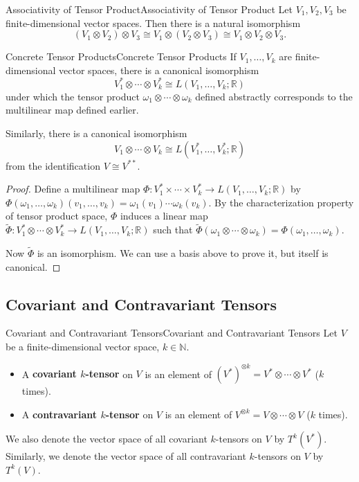 \documentclass[../main.tex]{subfiles}
\begin{document}
\begin{proposition}{Associativity of Tensor Product}{Associativity of Tensor Product}
  Let $V_1, V_2, V_3$ be finite-dimensional vector spaces. Then there is a natural isomorphism
  \begin{equation*}
    (V_1 \otimes V_2) \otimes V_3 \cong V_1 \otimes (V_2 \otimes V_3) \cong V_1 \otimes V_2 \otimes V_3.
  \end{equation*}
\end{proposition}

\begin{proposition}{Concrete Tensor Products}{Concrete Tensor Products}
  If $V_1, \ldots, V_k$ are finite-dimensional vector spaces, there is a canonical isomorphism
  \begin{equation}
    V_1^* \otimes \cdots \otimes V_k^* \cong L(V_1, \ldots, V_k; \mathbb{R})
  \end{equation}
  under which the tensor product $\omega_1 \otimes \cdots \otimes \omega_k$ defined abstractly corresponds to the multilinear map defined earlier.

  Similarly, there is a canonical isomorphism
  \begin{equation}
    V_1 \otimes \cdots \otimes V_k \cong L(V_1^*, \ldots, V_k^*; \mathbb{R})
  \end{equation}
  from the identification $V \cong V^{**}$.
\end{proposition}
\begin{proof}
  Define a multilinear map $\Phi: V_1^* \times \cdots \times V_k^* \to L(V_1, \ldots, V_k; \mathbb{R})$ by $\Phi(\omega_1, \ldots, \omega_k)(v_1, \ldots, v_k) = \omega_1(v_1) \cdots \omega_k(v_k)$. By the characterization property of tensor product space, $\Phi$ induces a linear map $\tilde{\Phi}: V_1^* \otimes \cdots \otimes V_k^* \to L(V_1, \ldots, V_k; \mathbb{R})$ such that $\tilde{\Phi}(\omega_1 \otimes \cdots \otimes \omega_k) = \Phi(\omega_1, \ldots, \omega_k)$.

  Now $\tilde{\Phi}$ is an isomorphism. We can use a basis above to prove it, but itself is canonical.
\end{proof}

\subsection{Covariant and Contravariant Tensors}
\begin{definition}{Covariant and Contravariant Tensors}{Covariant and Contravariant Tensors}
  Let $V$ be a finite-dimensional vector space, $k\in \mathbb{N}$.
  \begin{itemize}
    \item A \textbf{covariant $k$-tensor} on $V$ is an element of $(V^*)^{\otimes k} = V^* \otimes \cdots \otimes V^*$ ($k$ times).
    \item A \textbf{contravariant $k$-tensor} on $V$ is an element of $V^{\otimes k} = V \otimes \cdots \otimes V$ ($k$ times).
  \end{itemize}
  We also denote the vector space of all covariant $k$-tensors on $V$ by $T^k(V^*)$. Similarly, we denote the vector space of all contravariant $k$-tensors on $V$ by $T^k(V)$.
\end{definition}
\end{document}
